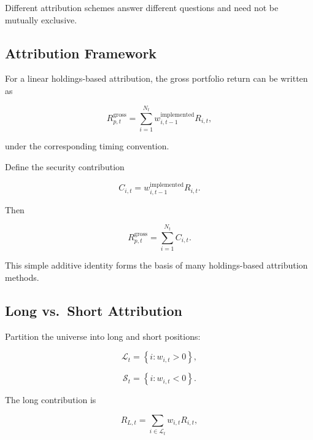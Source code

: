 \documentclass[11pt,a4paper]{article}
\begin{document}
Different attribution schemes answer different questions and need not be
mutually exclusive.


\subsection{Attribution Framework}

For a linear holdings-based attribution, the gross portfolio return can be
written as

\begin{equation}
\boxed{
R_{p,t}^{\mathrm{gross}}
=
\sum_{i=1}^{N_t}
w_{i,t-1}^{\mathrm{implemented}}
R_{i,t},
}
\end{equation}

under the corresponding timing convention.

Define the security contribution

\begin{equation}
\boxed{
C_{i,t}
=
w_{i,t-1}^{\mathrm{implemented}}
R_{i,t}.
}
\end{equation}

Then

\begin{equation}
\boxed{
R_{p,t}^{\mathrm{gross}}
=
\sum_{i=1}^{N_t}
C_{i,t}.
}
\end{equation}

This simple additive identity forms the basis of many holdings-based attribution
methods.


\subsection{Long vs.\ Short Attribution}

Partition the universe into long and short positions:

\begin{equation}
\mathcal{L}_t
=
\left\{
i:w_{i,t}>0
\right\},
\end{equation}

\begin{equation}
\mathcal{S}_t
=
\left\{
i:w_{i,t}<0
\right\}.
\end{equation}

The long contribution is

\begin{equation}
\boxed{
R_{L,t}
=
\sum_{i\in\mathcal{L}_t}
w_{i,t}R_{i,t},
}
\end{equation}
\end{document}
